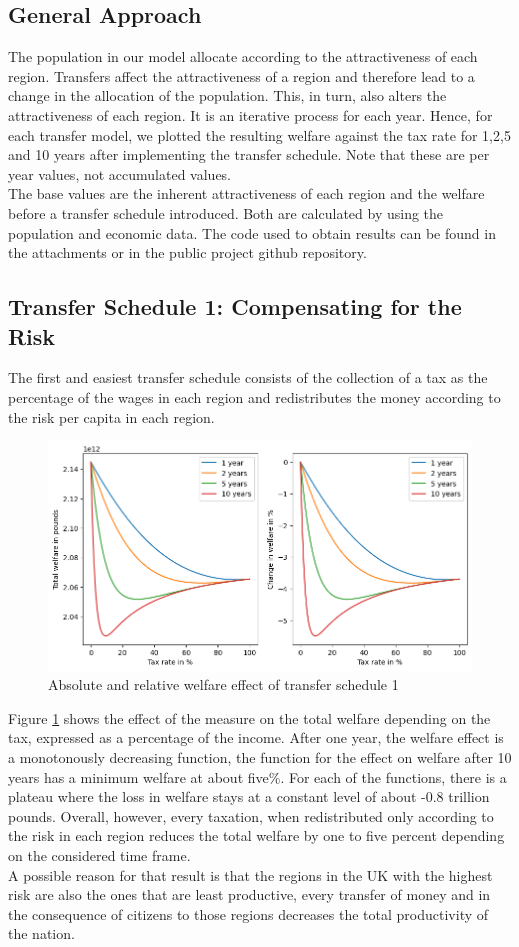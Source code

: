 \documentclass[10pt,a4paper]{article}
\begin{document}
\subsection{General Approach}
The population in our model allocate according to the attractiveness of each region. Transfers affect the attractiveness of a region and therefore lead to a change in the allocation of the population. This, in turn, also alters the attractiveness of each region. It is an iterative process for each year. Hence, for each transfer model, we plotted the resulting welfare against the tax rate for 1,2,5 and 10 years after implementing the transfer schedule. Note that these are per year values, not accumulated values.
\\
The base values are the inherent attractiveness of each region and the welfare before a transfer schedule introduced. Both are calculated by using the population and economic data. The code used to obtain results can be found in the attachments or in the public project github repository\cite{art2022nick4rt}.
\subsection{Transfer Schedule 1: Compensating for the Risk}
The first and easiest transfer schedule consists of the collection of a tax as the percentage of the wages in each region and redistributes the money according to the risk per capita in each region.
\begin{figure}[H]
    \centering
    \includegraphics[width=\textwidth]{Report/Schedule_1_graphics.png}
    \caption{Absolute and relative welfare effect of transfer schedule 1}
    \label{fig:sche1}
\end{figure}
Figure \ref{fig:sche1} shows the effect of the measure on the total welfare depending on the tax, expressed as a percentage of the income. After one year, the welfare effect is a monotonously decreasing function, the function for the effect on welfare after 10 years has a minimum welfare at about five\%. For each of the functions, there is a plateau where the loss in welfare stays at a constant level of about -0.8 trillion pounds. Overall, however, every taxation, when redistributed only according to the risk in each region reduces the total welfare by one to five percent depending on the considered time frame. 
\\
A possible reason for that result is that the regions in the UK with the highest risk are also the ones that are least productive, every transfer of money and in the consequence of citizens to those regions decreases the total productivity of the nation.
\end{document}
